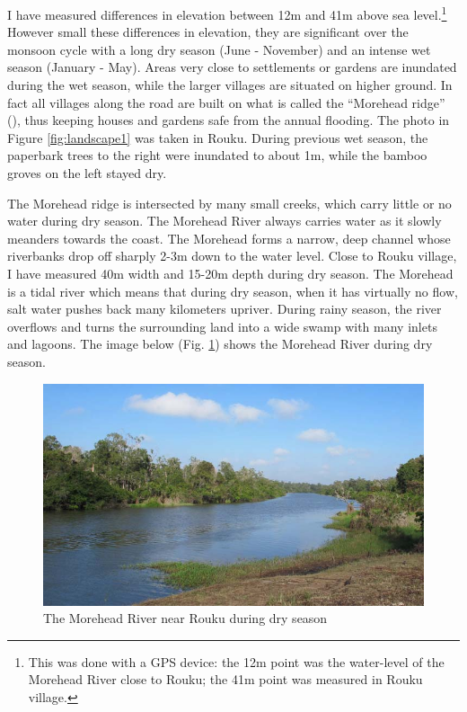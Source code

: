 I have measured differences in elevation between 12m and 41m above sea level.\footnote{This was done with a GPS device: the 12m point was the water-level of the Morehead River close to Rouku; the 41m point was measured in Rouku village.} However small these differences in elevation, they are significant over the monsoon cycle with a long dry season (June - November) and an intense wet season (January - May). Areas very close to settlements or gardens are inundated during the wet season, while the larger villages are situated on higher ground. In fact all villages along the road are built on what is called the ``Morehead ridge'' (\citealt[15]{Paijmans:1971morehead}), thus keeping houses and gardens safe from the annual flooding. The photo in Figure \ref{fig:landscape1} was taken in Rouku. During previous wet season, the paperbark trees to the right were inundated to about 1m, while the bamboo groves on the left stayed dry.%

The Morehead ridge is intersected by many small creeks, which carry little or no water during dry season. The Morehead River always carries water as it slowly meanders towards the coast. The Morehead forms a narrow, deep channel whose riverbanks drop off sharply 2-3m down to the water level. Close to Rouku village, I have measured 40m width and 15-20m depth during dry season. The Morehead is a tidal river which means that during dry season, when it has virtually no flow, salt water pushes back many kilometers upriver. During rainy season, the river overflows and turns the surrounding land into a wide swamp with many inlets and lagoons. The image below (Fig. \ref{fig:landscape2}) shows the Morehead River during dry season.

\begin{figure}

    \includegraphics[trim={0 0.3cm 0 0.3cm}, clip=true, width=.9\textwidth]{figures/landscape2.jpg}
  \caption[Morehead River]{The Morehead River near Rouku during dry season}
  \label{fig:landscape2}
\end{figure}
 \vspace{-.3cm}

